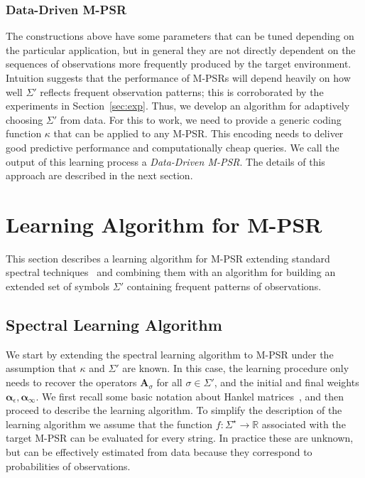 \documentclass[letterpaper]{article}
\newcommand{\mat}[1]{\mathbf{#1}}
\newcommand{\A}{\mat{A}}
\newcommand{\Rset}{\mathbb{R}}
\newcommand{\R}{\Rset}
\newcommand{\sstar}{\Sigma^\star}
\newcommand{\aone}{\boldsymbol{\alpha}_\epsilon}
\newcommand{\ainf}{\boldsymbol{\alpha}_{\infty}}
\begin{document}
\subsubsection{Data-Driven M-PSR}

The constructions above have some parameters that can be tuned depending on the particular application, but in general they are not directly dependent on the sequences of observations more frequently produced by the target environment. Intuition suggests that the performance of M-PSRs will depend heavily on how well $\Sigma'$ reflects frequent observation patterns; this is corroborated by the experiments in Section~\ref{sec:exp}. Thus, we develop an algorithm for adaptively choosing $\Sigma'$ from data. For this to work, we need to provide a generic coding function $\kappa$ that can be applied to any M-PSR. This encoding needs to deliver good predictive performance and computationally cheap queries. We call the output of this learning process a \emph{Data-Driven M-PSR}. The details of this approach are described in the next section.

\section{Learning Algorithm for M-PSR}

This section describes a learning algorithm for M-PSR extending standard spectral techniques~\cite{bootspsr} and combining them with an algorithm for building an extended set of symbols $\Sigma'$ containing frequent patterns of observations.

\subsection{Spectral Learning Algorithm}

We start by extending the spectral learning algorithm to M-PSR under the assumption that $\kappa$ and $\Sigma'$ are known. In this case, the learning procedure only needs to recover the operators $\A_\sigma$ for all $\sigma \in \Sigma'$, and the initial and final weights $\aone, \ainf$. We first recall some basic notation about Hankel matrices~\cite{CarlylePaz71,Fliess74}, and then proceed to describe the learning algorithm. To simplify the description of the learning algorithm we assume that the function $f : \sstar \to \R$ associated with the target M-PSR can be evaluated for every string. In practice these are unknown, but can be effectively estimated from data because they correspond to probabilities of observations. 
\end{document}
